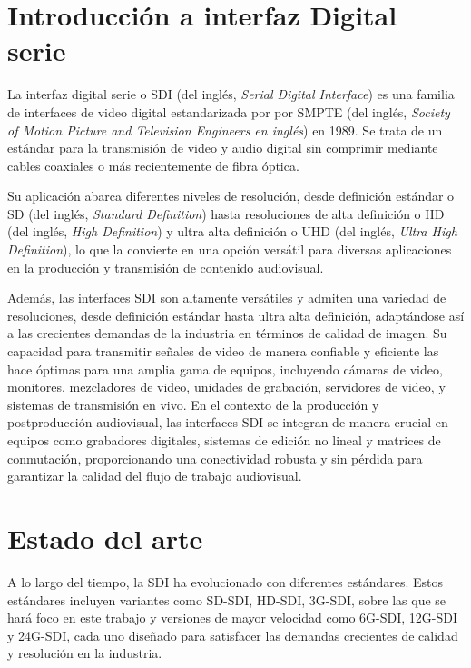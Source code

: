 \section{Introducción a interfaz Digital serie}

La interfaz digital serie o SDI (del inglés, \textit{Serial Digital Interface})
es una familia de interfaces de video digital estandarizada por
por SMPTE (del inglés, \textit{Society of Motion Picture and Television Engineers en inglés}) en
1989. Se trata de un estándar para la transmisión de video y audio digital sin
comprimir mediante cables coaxiales o más recientemente de fibra óptica.

Su aplicación abarca diferentes niveles de resolución, desde definición
estándar o SD (del inglés, \textit{Standard Definition}) hasta resoluciones de
alta definición o HD (del inglés, \textit{High Definition}) y ultra alta
definición o UHD (del inglés, \textit{Ultra High Definition}), lo que la convierte
en una opción versátil para diversas aplicaciones en la producción y transmisión
de contenido audiovisual.

Además, las interfaces SDI son altamente versátiles y admiten una variedad de
resoluciones, desde definición estándar hasta ultra alta definición, adaptándose
así a las crecientes demandas de la industria en términos de calidad de imagen.
Su capacidad para transmitir señales de video de manera confiable y eficiente
las hace óptimas para una amplia gama de equipos, incluyendo cámaras de video,
monitores, mezcladores de video, unidades de grabación, servidores de video, y
sistemas de transmisión en vivo. En el contexto de la producción y
postproducción audiovisual, las interfaces SDI se integran de manera crucial en
equipos como grabadores digitales, sistemas de edición no lineal y matrices de
conmutación, proporcionando una conectividad robusta y sin pérdida para
garantizar la calidad del flujo de trabajo audiovisual.

\section{Estado del arte}

A lo largo del tiempo, la SDI ha evolucionado con diferentes estándares. Estos
estándares incluyen variantes como SD-SDI, HD-SDI, 3G-SDI, sobre las que se
hará foco en este trabajo y versiones de mayor velocidad como 6G-SDI, 12G-SDI
y 24G-SDI, cada uno diseñado para satisfacer las demandas crecientes de calidad
y resolución en la industria.

